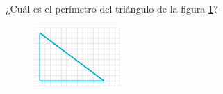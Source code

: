 
\question[25]  ¿Cuál es el perímetro del triángulo de la figura \ref{fig:peri_rect_02}?
\begin{figure}[H]
    \begin{center}
        \includegraphics[width=0.3\textwidth]{../images/peri_rect_02.png}
    \end{center}
    \caption{}
    \label{fig:peri_rect_02}
\end{figure}